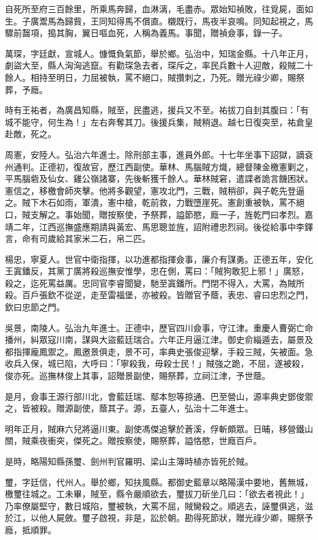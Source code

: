 \begin{pinyinscope}
自死所至府三百餘里，所乘馬奔歸，血淋漓，毛盡赤。眾始知禎敗，往覓屍，面如生。子廣鬻馬為歸貲，王同知得馬不償直。櫬既行，馬夜半哀鳴。同知起視之，馬驟前齧項，搗其胸，翼日嘔血死，人稱為義馬。事聞，贈禎僉事，錄一子。

萬琛，字廷獻，宣城人。慷慨負氣節，舉於鄉。弘治中，知瑞金縣。十八年正月，劇盜大至，縣人洶洶逃竄。有勸琛急去者，琛斥之，率民兵數十人迎敵，殺賊二十餘人。相持至明日，力屈被執，罵不絕口，賊攢刺之，乃死。贈光祿少卿，賜祭葬，予廕。

時有王祐者，為廣昌知縣，賊至，民盡逃，援兵又不至。祐拔刀自刲其腹曰：「有城不能守，何生為！」左右奔奪其刀。後援兵集，賊稍退。越七日復突至，祐倉皇赴敵，死之。

周憲，安陸人。弘治六年進士。除刑部主事，進員外郎。十七年坐事下詔獄，謫袞州通判。正德初，復故官，歷江西副使。華林、馬腦賊方熾，總督陳金檄憲剿之，平馬腦砦及仙女、雞公嶺諸寨，先後斬獲千餘人。華林賊窘，遣諜者詭言饑困狀。憲信之，移檄會師夾擊。他將多觀望，憲攻北門，三戰，賊稍卻，與子乾先登逼之。賊下木石如雨，軍潰，憲中槍，乾前救，力戰墮崖死。憲創重被執，罵不絕口，賊支解之。事始聞，贈按察使，予祭葬，謚節愍，廕一子，旌乾門曰孝烈。嘉靖二年，江西巡撫盛應期請與黃宏、馬思聰並旌，詔附禮忠烈祠。後從給事中李鐸言，命有司歲給其家米二石，帛二匹。

楊忠，寧夏人。世官中衛指揮，以功進都指揮僉事，廉介有謀勇。正德五年，安化王寘鐇反，其黨丁廣將殺巡撫安惟學，忠在側，罵曰：「賊狗敢犯上邪！」廣怒，殺之，迄死罵益厲。忠同官李睿聞變，馳至寘鐇所。門閉不得入，大罵，為賊所殺。百戶張欽不從逆，走至雷福堡，亦被殺。皆贈官予蔭，表忠、睿曰忠烈之門，欽曰忠節之門。

吳景，南陵人。弘治九年進士。正德中，歷官四川僉事，守江津。重慶人曹弼亡命播州，糾眾寇川南，謀與大盜藍廷瑞合。六年正月逼江津。御史俞緇遁去，屬景及都指揮龐鳳禦之。鳳邀景俱走，景不可，率典史張俊迎擊，手殺三賊，矢被面。急收兵入保，城已陷，大呼曰：「寧殺我，毋殺士民！」賊強之跪，不屈，遂被殺，俊亦死。巡撫林俊上其事，詔贈景副使，賜祭葬，立祠江津，予世蔭。

是月，僉事王源行部川北，會藍廷瑞、鄢本恕等掠通、巴至營山，源率典史鄧俊禦之，皆被殺。贈源副使，蔭其子。源，五臺人，弘治十二年進士。

明年正月，賊麻六兒將逼川東。副使馮傑追擊於蒼溪，俘斬頗眾。日晡，移營鐵山關，賊乘夜衝突，傑死之。贈按察使，賜祭葬，謚恪愍，世廕百戶。

是時，略陽知縣孫璽、劍州判官羅明、梁山主簿時植亦皆死於賊。

璽，字廷信，代州人。舉於鄉，知扶風縣。都御史藍章以略陽漢中要地，舊無城，檄璽往城之。工未畢，賊至，縣令嚴順欲去，璽拔刀斫坐几曰：「欲去者視此！」乃率僚屬堅守，數日城陷，璽被執，大罵不屈，賊臠殺之。順逃去，誣璽俱逃，滋於江，以他人屍斂。璽子啟視，非是，訟於朝。勘得死節狀，贈光祿少卿，賜祭予廕，抵順罪。


\end{pinyinscope}
